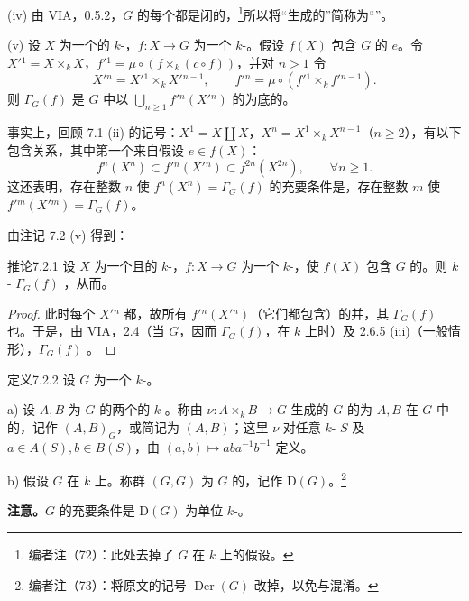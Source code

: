 (iv) 由 VIA，0.5.2，$G$ 的每个都是闭的，\footnote{编者注（72）：此处去掉了 $G$ 在 $k$ 上的假设。}所以将“生成的”简称为“”。

(v) 设 $X$ 为一个的 $k$-，$f:X\to G$ 为一个 $k$-。假设 $f(X)$ 包含 $G$ 的 $e$。令 $X'{}^1=X\times_k X$，$f'{}^1=\mu\circ(f\times_k(c\circ f))$，并对 $n>1$ 令
\[
X'{}^n=X'{}^1\times_k X'{}^{n-1},\qquad
f'{}^n=\mu\circ(f'{}^1\times_k f'{}^{n-1}).
\]
则 $\Gamma_G(f)$ 是 $G$ 中以 $\bigcup_{n\geq1}f'{}^n(X'{}^n)$ 的为底的。

事实上，回顾 7.1 (ii) 的记号：$X^1=X\amalg X$，$X^n=X^1\times_k X^{n-1}$（$n\geq2$），有以下包含关系，其中第一个来自假设 $e\in f(X)$：
\[
f^n(X^n)\subset f'{}^n(X'{}^n)\subset f^{2n}(X^{2n}),\qquad\forall n\geq1.
\]
这还表明，存在整数 $n$ 使 $f^n(X^n)=\Gamma_G(f)$ 的充要条件是，存在整数 $m$ 使 $f'{}^m(X'{}^m)=\Gamma_G(f)$。

由注记 7.2 (v) 得到：
\begin{SGAresult}{推论}{7.2.1}
设 $X$ 为一个且的 $k$-，$f:X\to G$ 为一个 $k$-，使 $f(X)$ 包含 $G$ 的。则 $k$- $\Gamma_G(f)$ ，从而。
\end{SGAresult}
\begin{proof}
此时每个 $X'{}^n$ 都，故所有 $f'{}^n(X'{}^n)$（它们都包含）的并，其 $\Gamma_G(f)$ 也。于是，由 VIA，2.4（当 $G$，因而 $\Gamma_G(f)$，在 $k$ 上时）及 2.6.5 (iii)（一般情形），$\Gamma_G(f)$ 。
\end{proof}

\begin{SGAresult}{定义}{7.2.2}
设 $G$ 为一个 $k$-。

a) 设 $A,B$ 为 $G$ 的两个的 $k$-。称由 $\nu:A\times_k B\to G$ 生成的 $G$ 的为 $A,B$ 在 $G$ 中的，记作 $(A,B)_G$，或简记为 $(A,B)$；这里 $\nu$ 对任意 $k$- $S$ 及 $a\in A(S),b\in B(S)$，由 $(a,b)\mapsto aba^{-1}b^{-1}$ 定义。

b) 假设 $G$ 在 $k$ 上。称群 $(G,G)$ 为 $G$ 的，记作 $\mathrm D(G)$。\footnote{编者注（73）：将原文的记号 $\operatorname{Der}(G)$ 改掉，以免与混淆。}
\end{SGAresult}
\textbf{注意。}$G$ 的充要条件是 $\mathrm D(G)$ 为单位 $k$-。

